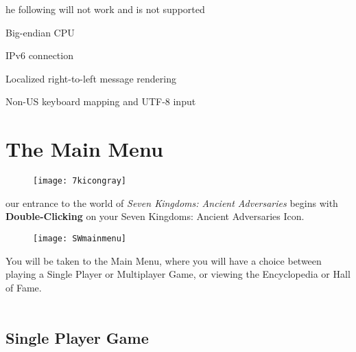 he following will not work and is not supported

\begin{changemargin}{0.5cm}{0cm} 
Big-endian CPU

IPv6 connection

Localized right-to-left message rendering

Non-US keyboard mapping and UTF-8 input
\end{changemargin}

\section{\textsf{The Main Menu}}


\begin{wrapfigure}{r}{0.1\textwidth}
	\vspace{-20pt}
	\begin{center}
		\texttt{[image: 7kicongray]}
	\end{center}
	\vspace{-20pt}
\end{wrapfigure}


our entrance to the world of \textit{Seven Kingdoms: Ancient Adversaries} begins with \textbf{Double-Clicking} on your Seven Kingdoms: Ancient Adversaries Icon.

\begin{wrapfigure}{r}{0.4\textwidth}
    \begin{center}
        \vspace{-20pt}
        \texttt{[image: SWmainmenu]} %
    \end{center}
    \vspace{-20pt}
\end{wrapfigure}

You will be taken to the Main Menu, where you will have a choice between playing a Single Player or Multiplayer Game, or viewing the Encyclopedia or Hall of Fame. \\ \\ %


\subsection{\textsf{Single Player Game}}

